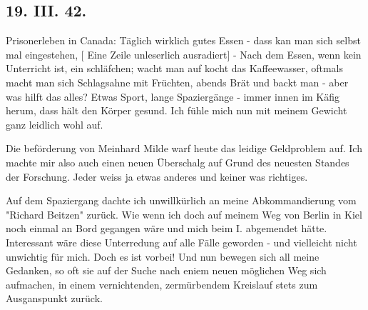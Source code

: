 \subsection{19. III. 42.}

Prisonerleben in Canada: T\"{a}glich wirklich gutes Essen - dass kan man sich selbst mal eingestehen,
{\color{red} [ Eine Zeile unleserlich ausradiert] } -
Nach dem Essen, wenn kein Unterricht ist, ein schl\"{a}fchen; wacht man auf kocht das Kaffeewasser, oftmals macht man sich Schlagsahne mit Fr\"{u}chten, abends Br\"{a}t und backt man - aber was hilft das alles?
Etwas Sport, lange Spazierg\"{a}nge - immer innen im K\"{a}fig herum, dass h\"{a}lt den K\"{o}rper gesund.
Ich f\"{u}hle mich nun mit meinem Gewicht ganz leidlich wohl auf.

Die bef\"{o}rderung von Meinhard Milde warf heute das leidige Geldproblem auf.
Ich machte mir also auch einen neuen \"{U}berschalg auf Grund des neuesten Standes der Forschung.
Jeder weiss ja etwas anderes und keiner was richtiges.

Auf dem Spaziergang dachte ich unwillk\"{u}rlich an meine Abkommandierung vom "Richard Beitzen" zur\"{u}ck.
Wie wenn ich doch auf meinem Weg von Berlin in Kiel noch einmal an Bord gegangen w\"{a}re und mich beim I. abgemendet h\"{a}tte.
Interessant w\"{a}re diese Unterredung auf alle F\"{a}lle geworden - und vielleicht nicht unwichtig f\"{u}r mich.
Doch es ist vorbei!
Und nun bewegen sich all meine Gedanken, so oft sie auf der Suche nach eniem neuen m\"{o}glichen Weg sich aufmachen, in einem vernichtenden, zerm\"{u}rbendem Kreislauf stets zum Ausganspunkt zur\"{u}ck.

\clearpage
